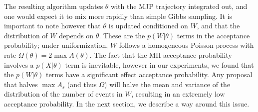 The resulting algorithm updates $\theta$ with the MJP trajectory integrated out, 
and one would expect it to mix more rapidly than simple Gibbs sampling. 
It is important to note however that $\theta$ is updated conditioned on
$W$, and that
the distribution of $W$ depends on $\theta$. These are the $p(W|\theta)$ terms
in the acceptance probability; under uniformization, $W$ follows a homogeneous
Poisson process with rate $\Omega(\theta) = 2 \max A(\theta)$. 
The fact that the MH-acceptance probability involves a $p(X|\theta)$ term
is inevitable, however in our experiments, we found that the $p(W|\theta)$
terms have a significant effect acceptance probability. 
Any proposal that halves $\max A_s$ (and thus $\Omega$) will halve the
mean and variance of the distribution of the number of events in $W$, 
resulting in an extremely low acceptance probability.
In the next section, we describe a way around this issue.

